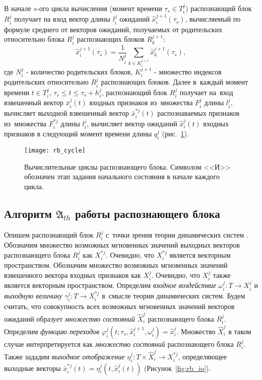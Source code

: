 В начале $s$-ого цикла вычисления (момент времени $\tau_s\in{T_i^j}$)  распознающий блок $R_i^j$ получает на вход вектор длины $l_i^j$ ожиданий $\hat{x}_i^{j+1}(\tau_s)$, вычисляемый по формуле среднего от векторов ожиданий, получаемых от родительских относительно блока $R_i^j$ распознающих блоков $R_k^{j+1}$:
\begin{equation}
	\hat{x}_i^{j+1}(\tau_s)=\frac{1}{N_i^j}\sum_{k{\in}K_i^{j+1}}\hat{x}_k^{j+1}(\tau_s),
\end{equation}
где $N_i^j$ - количество родительских блоков, $K_i^{j+1}$ - множество индексов родительских относительно $R_i^j$ распознающих блоков. Далее в~каждый момент времени $t\in{T_i^j}$, $\tau_s\leqslant{t}\leqslant\tau_s+h_i^j$,  распознающий блок $R_i^j$ получает на~вход взвешенный вектор $\bar{x}_i^j(t)$ входных признаков из~множества $F_i^j$ длины $l_i^j$, вычисляет выходной взвешенный вектор $\bar{x}_i^{*j}(t)$ распознаваемых признаков из~множества $F_i^{*j}$ длины $l_i^j$, вычисляет вектор ожиданий $\hat{x}_i^j(t)$ входных признаков в следующий момент времени длины $q_i^j$ (рис.~\ref{fig:rb_cycle}).
	
\begin{figure}[h]
	\centering
	\texttt{[image: rb\_cycle]}
	\caption{Вычислительные циклы распознающего блока. Символом <<И>> обозначен этап задания начального состояния в начале каждого цикла.}
	\label{fig:rb_cycle}  
\end{figure}

\subsection{Алгоритм $\mathfrak A_{th}$ работы распознающего блока}\label{subsect:rb_algorithm}

Опишем распознающий блок $R_i^j$ с~точки зрения теории динамических систем \cite{KalmanE1971,Kalman1971}. Обозначим множество возможных мгновенных значений выходных векторов распознающего блока $R_i^j$ как $X_i^{*j}$. Очевидно, что $X_i^{*j}$ является векторным пространством. Обозначим множество возможных мгновенных значений взвешенного вектора входных признаков как $X_i^j$. Очевидно, что $X_i^j$ также является векторным пространством. Определим \textit{входное воздействие} $\omega_i^j:T{\to}X_i^j$ и \textit{выходную величину} $\gamma_i^j:T{\to}X_i^{*j}$ в~смысле теории динамических систем. Будем считать, что совокупность всех возможных мгновенных значений векторов ожиданий образует \textit{множество состояний} $\hat{X}_i^j$ распознающего блока $R_i^j$. Определим \textit{функцию переходов} $\varphi_i^j(t;\tau_s,\hat{x}_i^{j+1},\omega_i^j)=\hat{x}_i^j$. Множество $\hat{X}_i^j$ в таком случае интерпретируется как \textit{множество состояний} распознающего блока $R_i^j$. Также зададим \textit{выходное отображение} $\eta_i^j:T{\times}\hat{X}_i^j{\to}X_i^{*j}$, определяющее выходные векторы $\bar{x}_i^{*j}(t)=\eta_i^j(t,\hat{x}_i^j(t))$ (Рисунок~\ref{fig:rb_io}).


